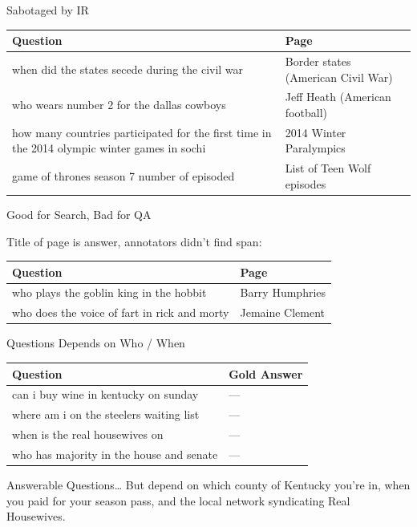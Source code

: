 \documentclass[xcolor=dvipsnames,xcolor=table]{beamer}
\begin{document}
\begin{frame}{Sabotaged by IR}

  \begin{small}
  \begin{tabular}{p{7cm}p{3cm}}
    \toprule
    Question & Page \\
    \hline
 when did the states secede during the civil war &  Border states (American Civil War) \\
 who wears number 2 for the dallas cowboys &  Jeff Heath (American football) \\
 how many countries participated for the first time in the 2014 olympic winter games in sochi & 2014 Winter Paralympics \\
 game of thrones season 7 number of episoded &  List of Teen Wolf episodes \\
 \bottomrule
  \end{tabular}
  \end{small}

\end{frame}

\begin{frame}{Good for Search, Bad for QA}

  Title of page is answer, annotators didn't find span:
  \begin{tabular}{p{7cm}p{3cm}}
    \toprule
    Question & Page \\
    \hline
  who plays the goblin king in the hobbit &  Barry Humphries  \\
  who does the voice of fart in rick and morty & Jemaine Clement   \\
 \bottomrule
  \end{tabular}
\end{frame}

\begin{frame}{Questions Depends on Who / When}
  \begin{tabular}{p{8cm}p{2cm}}
    \toprule
    Question & Gold Answer \\
    \hline
    can i buy wine in kentucky on sunday & --- \\
    where am i on the steelers waiting list & --- \\
    when is the real housewives on & --- \\
    who has majority in the house and senate & --- \\
    \bottomrule
  \end{tabular}  

  \pause

  \begin{block}{Answerable Questions\dots}
  But depend on which county of Kentucky you're in,
  when you paid for your season pass, and the local network
  syndicating Real Housewives.
  \end{block}
  
\end{frame}
\end{document}
